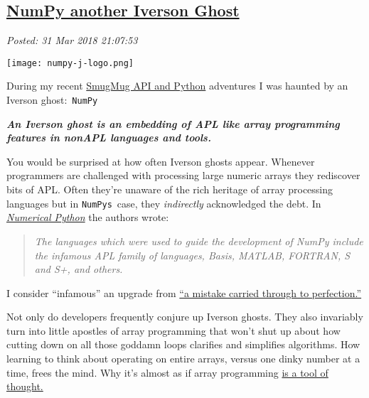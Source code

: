 %

\subsection*{\href{http://analyzethedatanotthedrivel.org/2018/03/31/numpy-another-iverson-ghost/}{NumPy another Iverson Ghost}}


\noindent\emph{Posted: 31 Mar 2018 21:07:53}
\vspace{6pt}


\captionsetup[floatingfigure]{labelformat=empty}
\begin{floatingfigure}[l]{0.23\textwidth}
\centering
\texttt{[image: numpy-j-logo.png]}
\label{fig:5565x0}
\end{floatingfigure}During
my recent \href{https://github.com/bakerjd99/smugpyter}{SmugMug API and
Python} adventures I was haunted by an Iverson ghost:~\texttt{NumPy}

\medskip

\emph{\textbf{An Iverson ghost is an embedding of APL like array
programming features in nonAPL languages and tools.}}

\medskip

You would be surprised at how often Iverson ghosts appear. Whenever
programmers are challenged with processing large numeric arrays they
rediscover bits of APL. Often they're unaware of the rich heritage of
array processing languages but in
\texttt{NumPy\textquotesingle{}s}~case, they \emph{indirectly}
acknowledged the debt. In
\href{http://numpy.sourceforge.net/numdoc/numdoc.pdf}{\emph{Numerical
Python}} the authors wrote:


\begin{quote}
\emph{The languages which were used to guide the development of NumPy
include the infamous APL family of languages, Basis, MATLAB, FORTRAN, S
and S+, and others.}
\end{quote}


I consider ``infamous'' an upgrade from
\href{http://www.cs.virginia.edu/~evans/cs655/readings/ewd498.html}{``a
mistake carried through to perfection.''}

Not only do developers frequently conjure up Iverson ghosts. They also
invariably turn into little apostles of array programming that won't
shut up about how cutting down on all those goddamn loops clarifies and
simplifies algorithms. How learning to think about operating on entire
arrays, versus one dinky number at a time, frees the mind. Why it's
almost as if array programming
\href{http://www.jsoftware.com/papers/tot.htm}{is a tool of thought.}

